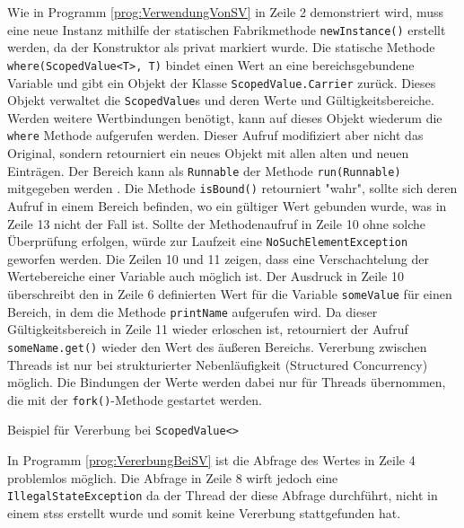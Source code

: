    Wie in Programm \ref{prog:VerwendungVonSV} in Zeile 2 demonstriert wird, muss eine neue Instanz mithilfe der statischen Fabrikmethode \texttt{newInstance()} erstellt werden, da der Konstruktor als privat 
    markiert wurde. 
    Die statische Methode \texttt{where(ScopedValue<T>, T)} bindet einen Wert an eine bereichsgebundene Variable und gibt ein Objekt der Klasse \texttt{ScopedValue.Carrier} zurück.
    Dieses Objekt verwaltet die \texttt{ScopedValue}s und deren Werte und Gültigkeitsbereiche. Werden weitere Wertbindungen benötigt, kann auf dieses Objekt wiederum die \texttt{where} Methode 
    aufgerufen werden. Dieser Aufruf modifiziert aber nicht das Original, sondern retourniert ein neues Objekt mit allen alten und neuen Einträgen. Der Bereich kann als \texttt{Runnable}
    der Methode \texttt{run(Runnable)} mitgegeben werden \cite{oracle22Carrier}. 
    Die Methode \texttt{isBound()} retourniert "wahr", sollte sich deren Aufruf in einem Bereich befinden, wo ein gültiger Wert gebunden wurde, was in Zeile 13 nicht der Fall ist.
    Sollte der Methodenaufruf in Zeile 10 ohne solche Überprüfung erfolgen, würde zur Laufzeit eine \texttt{NoSuchElementException} geworfen werden.
    Die Zeilen 10 und 11 zeigen, dass eine Verschachtelung der Wertebereiche einer Variable auch möglich ist. Der Ausdruck in Zeile 10 überschreibt den in Zeile 6 definierten Wert für die Variable
    \texttt{someValue} für einen Bereich, in dem die Methode \texttt{printName} aufgerufen wird. Da dieser Gültigkeitsbereich in Zeile 11 wieder erloschen ist, retourniert der Aufruf
    \texttt{someName.get()} wieder den Wert des äußeren Bereichs. Vererbung zwischen Threads ist nur bei strukturierter Nebenläufigkeit (Structured Concurrency) möglich. Die Bindungen der Werte
    werden dabei nur für Threads übernommen, die mit der \texttt{fork()}-Methode gestartet werden.
    \begin{program} [H]
        \caption{Beispiel für Vererbung bei \texttt{ScopedValue<>}}
        \label{prog:VererbungBeiSV}
    \begin{JavaCode}[language=Java, numbers=left]
private static final ScopedValue<String> NAME = ScopedValue.newInstance();
ScopedValue.runWhere(NAME, "duke", () -> {
    try (var scope = new StructuredTaskScope<String>()) {
        scope.fork(() -> {System.out.println(STR."Name: \{NAME.get()}");
        return null;});
    }
    Thread.ofVirtual().start(() -> {
        System.out.println(STR."Name: \{NAME.get()}");
    });    
});\end{JavaCode}
\end{program}
In Programm \ref{prog:VererbungBeiSV} ist die Abfrage des Wertes in Zeile 4 problemlos möglich. Die Abfrage in Zeile 8 wirft
jedoch eine \texttt{IllegalStateException} da der Thread der diese Abfrage durchführt, nicht in einem \Glspl{sts}
erstellt wurde und somit keine Vererbung stattgefunden hat.

